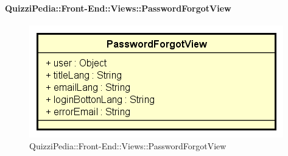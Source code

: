 \paragraph{QuizziPedia::Front-End::Views::PasswordForgotView}
\begin{figure} [ht]
	\centering
	\includegraphics[scale=0.45]{UML/Classi/Front-End/QuizziPedia_Front-end_Views_PasswordForgotView.png}
	\caption{QuizziPedia::Front-End::Views::PasswordForgotView}
\end{figure} \FloatBarrier
